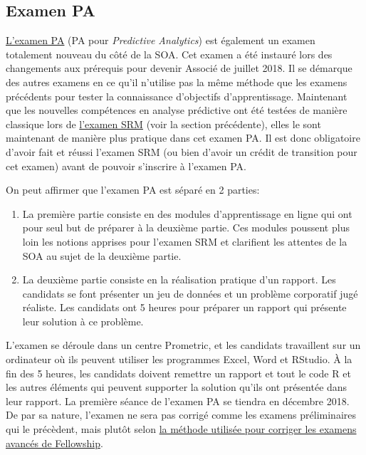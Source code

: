 \subsection*{Examen PA}
\label{subsec:exampa}

\href{https://www.soa.org/Education/Exam-Req/edu-exam-pa-detail.aspx}{L'examen PA} (PA pour \textit{Predictive Analytics}) est également un examen totalement nouveau du côté de la SOA. Cet examen a été instauré lors des changements aux prérequis pour devenir Associé de juillet 2018. Il se démarque des autres examens en ce qu'il n'utilise pas la même méthode que les examens précédents pour tester la connaissance d'objectifs d'apprentissage. Maintenant que les nouvelles compétences en analyse prédictive ont été testées de manière classique lors de \href{https://www.soa.org/Education/Exam-Req/edu-exam-srm-detail.aspx}{l'examen SRM} (voir la section précédente), elles le sont maintenant de manière plus pratique dans cet examen PA. Il est donc obligatoire d'avoir fait et réussi l'examen SRM (ou bien d'avoir un crédit de transition pour cet examen) avant de pouvoir s'inscrire à l'examen PA. \vspace{\baselineskip}

On peut affirmer que l'examen PA est séparé en 2 parties:
\begin{enumerate}
\item La première partie consiste en des modules d'apprentissage en ligne qui ont pour seul but de préparer à la deuxième partie. Ces modules poussent plus loin les notions apprises pour l'examen SRM et clarifient les attentes de la SOA au sujet de la deuxième partie.
\item La deuxième partie consiste en la réalisation pratique d'un rapport. Les candidats se font présenter un jeu de données et un problème corporatif jugé réaliste. Les candidats ont 5 heures pour préparer un rapport qui présente leur solution à ce problème.
\end{enumerate}
\vspace{\baselineskip}

L'examen se déroule dans un centre Prometric, et les candidats travaillent sur un ordinateur où ils peuvent utiliser les programmes Excel, Word et RStudio. À la fin des 5 heures, les candidats doivent remettre un rapport et tout le code R et les autres éléments qui peuvent supporter la solution qu'ils ont présentée dans leur rapport. La première séance de l'examen PA se tiendra en décembre 2018. De par sa nature, l'examen ne sera pas corrigé comme les examens préliminaires qui le précèdent, mais plutôt selon \href{https://www.soa.org/Education/General-Info/edu-guide-written-exams-seminar-vids.aspx}{la méthode utilisée pour corriger les examens avancés de Fellowship}. \vspace{\baselineskip}

